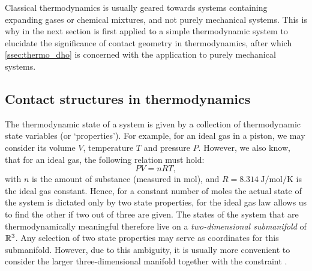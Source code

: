 Classical thermodynamics is usually geared towards systems containing expanding gases or chemical mixtures, and not purely mechanical systems. This is why in the next section is first applied to a simple thermodynamic system to elucidate the significance of contact geometry in thermodynamics, after which \cref{ssec:thermo_dho} is concerned with the application to purely mechanical systems.

\subsection{Contact structures in thermodynamics} 
The thermodynamic state of a system is given by a collection of thermodynamic state variables (or `properties'). For example, for an ideal gas in a piston, we may consider its volume $V$, temperature $T$ and pressure $P$. However, we also know, that for an ideal gas, the following relation must hold:
\begin{equation}
    PV = nRT,
    \label{eq:ideal_gas}
\end{equation}
with $n$ is the amount of substance (measured in \si{\mole}), and $R = \SI{8.314}{\joule \per \mole \per \kelvin}$ is the ideal gas constant.  Hence, for a constant number of moles the actual state of the system is dictated only by two state properties, for the ideal gas law allows us to find the other if two out of three are given. The states of the system that are thermodynamically meaningful therefore live on a \emph{two-dimensional submanifold} of $\mathbb{R}^3$. Any selection of two state properties may serve as coordinates for this submanifold. However, due to this ambiguity, it is usually more convenient to consider the larger three-dimensional manifold together with the constraint  \cite{Balian2001, Giancoli2014}.

